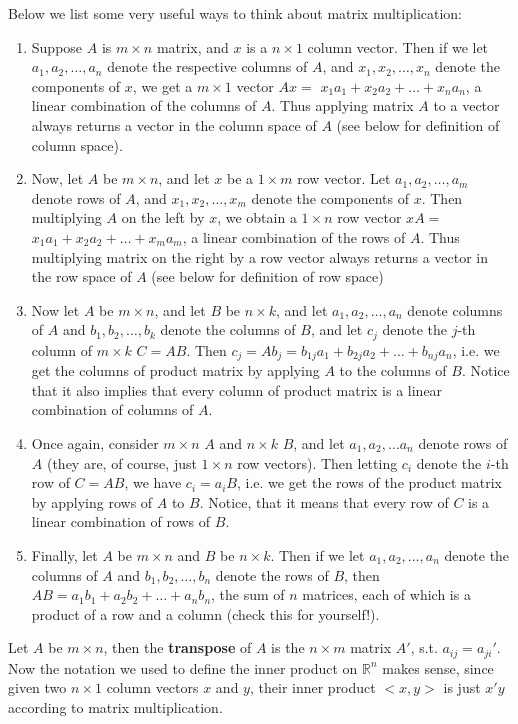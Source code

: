 \documentclass[12pt,oneside]{article}
\begin{document}
Below we list some very useful ways to think about matrix multiplication:
\begin{enumerate}
\item Suppose $A$ is $m \times n$ matrix, and $x$ is a $n \times 1$
  column vector. Then if we let $a_1, a_2, \ldots, a_n$ denote the respective
  columns of $A$, and $x_1, x_2, \ldots, x_n$ denote the components  of
  $x$,  we get a $m \times 1$ vector $Ax = $ $x_1 a_1 + x_2
  a_2 + \ldots + x_n a_n$, a linear combination of the columns of
  $A$. Thus applying matrix $A$ to a vector always returns a vector
  in the column space of $A$ (see below for definition of column
  space).
\item Now, let $A$ be $m \times n$, and let $x$ be a $1 \times m$ row
  vector. Let $a_1, a_2, \ldots, a_m$ denote rows of $A$, and $x_1,
  x_2, \ldots, x_m$ denote the components of $x$. Then multiplying $A$
  on the left by $x$, we obtain a $1 \times n$ row vector $x A =$ $x_1
  a_1 + x_2 a_2 + \ldots + x_m a_m$, a linear combination of the rows
  of $A$. Thus multiplying matrix on the right by a row vector always
  returns a vector in the row space of $A$ (see below for definition
  of row space)
\item Now let $A$ be $m \times n$, and let $B$ be $n \times k$, and
  let $a_1, a_2, \ldots, a_n$ denote columns of $A$ and  $b_1, b_2,
  \ldots, b_k$ denote the columns of $B$, and let $c_j$ denote the
  $j$-th column of $m \times k$ $C = AB$. Then $c_j = A b_j = b_{1j}
  a_1 + b_{2j} a_2 + \ldots +  b_{nj} a_n$, i.e. we get the columns of
  product matrix by applying $A$ to the columns of $B$. Notice that it
  also implies that every column of product matrix is a linear
  combination of columns of $A$.
\item Once again, consider $m \times n$ $A$ and $n \times k$ $B$, and
  let $a_1, a_2, \ldots a_n$ denote rows of $A$ (they are, of course,
  just $1 \times n$ row vectors). Then letting $c_i$ denote the $i$-th
  row of $C = AB$, we have $c_i = a_i B$, i.e. we get the rows of the
  product matrix by applying rows of $A$ to $B$. Notice, that it means
  that every row of $C$ is a linear combination of rows of $B$.
\item Finally, let $A$ be $m \times n$ and $B$ be $n \times k$. Then
  if we let $a_1, a_2, \ldots, a_n$ denote the columns of $A$ and
  $b_1, b_2, \ldots, b_n$ denote the rows of $B$, then $AB = a_1 b_1 +
  a_2 b_2 + \ldots + a_n b_n$, the sum of $n$ matrices, each of which
  is a product of a row and a column (check this for yourself!).
\end{enumerate}
Let $A$ be $m \times n$, then the \textbf{transpose} of $A$ is
the $n \times m$ matrix $A'$, s.t. $a_{ij} = a_{ji}'$. Now the
notation we used to define the inner product on ${\mathbb{R}}^n$ makes
sense, since given two $n \times 1$ column vectors $x$ and $y$, their
inner product $<x, y>$ is just $x'y$ according to matrix
multiplication.
\end{document}
